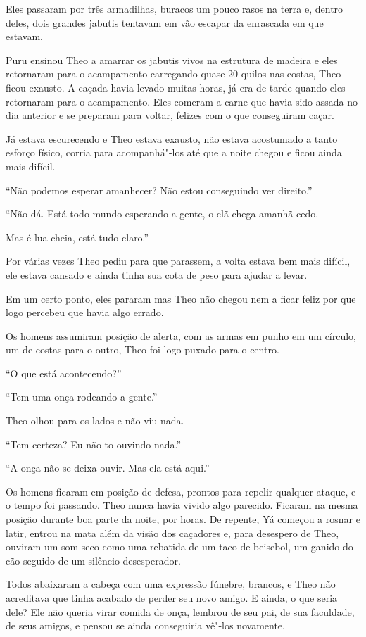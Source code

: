 Eles passaram por três armadilhas, buracos um pouco rasos na terra e,
dentro deles, dois grandes jabutis tentavam em vão escapar da enrascada
em que estavam.

Puru ensinou Theo a amarrar os jabutis vivos na estrutura de madeira e
eles retornaram para o acampamento carregando quase 20 quilos nas
costas, Theo ficou exausto. A caçada havia levado muitas horas, já era
de tarde quando eles retornaram para o acampamento. Eles comeram a carne
que havia sido assada no dia anterior e se preparam para voltar, felizes
com o que conseguiram caçar.

Já estava escurecendo e Theo estava exausto, não estava acostumado a
tanto esforço físico, corria para acompanhá"-los até que a noite chegou e
ficou ainda mais difícil.

``Não podemos esperar amanhecer? Não estou conseguindo ver direito.''

``Não dá. Está todo mundo esperando a gente, o clã chega amanhã cedo.

Mas é lua cheia, está tudo claro.''

Por várias vezes Theo pediu para que parassem, a volta estava bem mais
difícil, ele estava cansado e ainda tinha sua cota de peso para ajudar a
levar.

Em um certo ponto, eles pararam mas Theo não chegou nem a ficar feliz
por que logo percebeu que havia algo errado.

Os homens assumiram posição de alerta, com as armas em punho em um
círculo, um de costas para o outro, Theo foi logo puxado para o centro.

``O que está acontecendo?''

``Tem uma onça rodeando a gente.''

Theo olhou para os lados e não viu nada.

``Tem certeza? Eu não to ouvindo nada.''

``A onça não se deixa ouvir. Mas ela está aqui.''

Os homens ficaram em posição de defesa, prontos para repelir qualquer
ataque, e o tempo foi passando. Theo nunca havia vivido algo parecido.
Ficaram na mesma posição durante boa parte da noite, por horas. De
repente, Yá começou a rosnar e latir, entrou na mata além da visão dos
caçadores e, para desespero de Theo, ouviram um som seco como uma
rebatida de um taco de beisebol, um ganido do cão seguido de um silêncio
desesperador.

Todos abaixaram a cabeça com uma expressão fúnebre, brancos, e Theo não
acreditava que tinha acabado de perder seu novo amigo. E ainda, o que
seria dele? Ele não queria virar comida de onça, lembrou de seu pai, de
sua faculdade, de seus amigos, e pensou se ainda conseguiria vê"-los
novamente.

